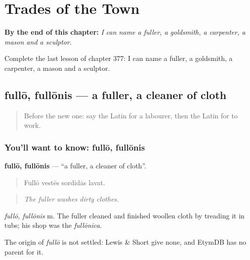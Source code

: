 
\chapter{Trades of the Town}
\label{ch:la-trades-of-the-town}

\begin{chapteropening}
\textbf{By the end of this chapter:} \emph{I can name a fuller, a goldsmith, a carpenter, a mason and a sculptor.}

Complete the last lesson of chapter 377: I can name a fuller, a goldsmith, a carpenter, a mason and a sculptor.
\end{chapteropening}

\section[fullō, fullōnis]{fullō, fullōnis — a fuller, a cleaner of cloth}

\label{lesson:LA-C377-fullo}



\begin{quote}
Before the new one: say the Latin for a labourer, then the Latin for to work.
\end{quote}

\subsection*{You'll want to know: fullō, fullōnis}
\textbf{fullō, fullōnis} — \textquotedblleft{}a fuller, a cleaner of cloth\textquotedblright{}.

\begin{quote}
Fullō vestēs sordidās lavat.
\end{quote}

\begin{quote}
\emph{The fuller washes dirty clothes.}
\end{quote}

\emph{fullō, fullōnis} m. The fuller cleaned and finished woollen cloth by treading it in tubs; his shop was the \emph{fullōnica}.

\begin{cousinweb}
The origin of \emph{fullō} is not settled: Lewis \& Short give none, and EtymDB has no parent for it.
\end{cousinweb}

